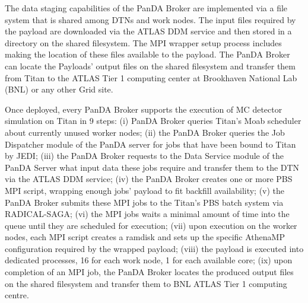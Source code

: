 The data staging capabilities of the PanDA Broker are implemented via a file
system that is shared among DTNs and work nodes. The input files required by the
payload are downloaded via the ATLAS DDM service and then stored in a directory
on the shared filesystem. The MPI wrapper setup process includes making the
location of these files available to the payload. The PanDA Broker can locate
the Payloads' output files on the shared filesystem and transfer them from Titan
to the ATLAS Tier 1 computing center at Brookhaven National Lab (BNL) or any
other Grid site.

Once deployed, every PanDA Broker supports the execution of MC
detector simulation on Titan in 9 steps: (i) PanDA Broker queries Titan's
Moab scheduler about currently unused worker nodes;
(ii) the PanDA Broker queries the Job Dispatcher module of the PanDA server for
jobs that have been bound to Titan by JEDI; (iii)  the PanDA Broker requests to
the Data Service module of the PanDA Server what input data these jobs require
and transfer them to the DTN via the ATLAS DDM service; (iv) the PanDA Broker
creates one or more PBS MPI script, wrapping enough jobs' payload to fit
backfill availability; (v) the PanDA Broker submits these MPI jobs to the
Titan's PBS batch system via RADICAL-SAGA; (vi) the MPI jobs waits a minimal
amount of time into the queue until they are scheduled for execution; (vii) upon
execution on the worker nodes, each MPI script creates a ramdisk and sets up the
specific AthenaMP configuration required by the wrapped payload; (viii) the
payload is executed into dedicated processes, 16 for each work node, 1 for each
available core; (ix) upon completion of an MPI job, the PanDA Broker locates the
produced output files on the shared filesystem and transfer them to BNL ATLAS
Tier 1 computing centre.




